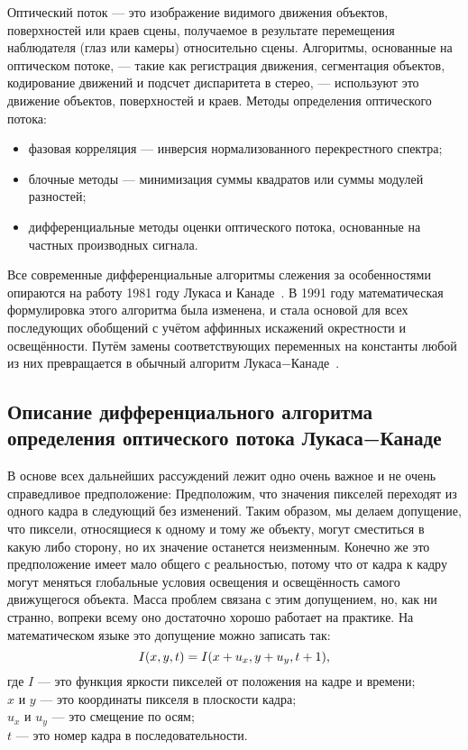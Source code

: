 Оптический поток — это изображение видимого движения объектов, поверхностей или краев сцены, получаемое в результате перемещения наблюдателя (глаз или камеры) относительно сцены. Алгоритмы, основанные на оптическом потоке, — такие как регистрация движения, сегментация объектов, кодирование движений и подсчет диспаритета в стерео, — используют это движение объектов, поверхностей и краев.
Методы определения оптического потока:
\begin{itemize}
\item фазовая корреляция — инверсия нормализованного перекрестного спектра;
\item блочные методы — минимизация суммы квадратов или суммы модулей разностей;
\item дифференциальные методы оценки оптического потока, основанные на частных производных сигнала.
\end{itemize}

Все современные дифференциальные алгоритмы слежения за особенностями опираются на работу 1981 году Лукаса и Канаде~\cite{Lucas1981}. В 1991 году математическая формулировка этого алгоритма была изменена, и стала основой для всех последующих обобщений с учётом аффинных искажений окрестности и освещённости. Путём замены соответствующих переменных на константы любой из них превращается в обычный алгоритм Лукаса−Канаде~\cite{lk_jou}.
\subsection{Описание дифференциального алгоритма определения оптического потока Лукаса−Канаде}
\label{subsec:lycas_kanade_81}
В основе всех дальнейших рассуждений лежит одно очень важное и не очень справедливое предположение: Предположим, что значения пикселей переходят из одного кадра в следующий без изменений. Таким образом, мы делаем допущение, что пиксели, относящиеся к одному и тому же объекту, могут сместиться в какую либо сторону, но их значение останется неизменным. Конечно же это предположение имеет мало общего с реальностью, потому что от кадра к кадру могут меняться глобальные условия освещения и освещённость самого движущегося объекта. Масса проблем связана с этим допущением, но, как ни странно, вопреки всему оно достаточно хорошо работает на практике. На математическом языке это допущение можно записать так:
\begin{equation}
\numberwithin{equation}{section}
\label{eq:f_1}
I(x,y,t)=I(x+u_x,y+u_y,t+1),
\end{equation}
где $I$ — это функция яркости пикселей от положения на кадре и времени;\\$x$ и $y$ — это координаты пикселя в плоскости кадра;\\
$u_x$ и $u_y$ — это смещение по осям;\\
$t$ — это номер кадра в последовательности. 

